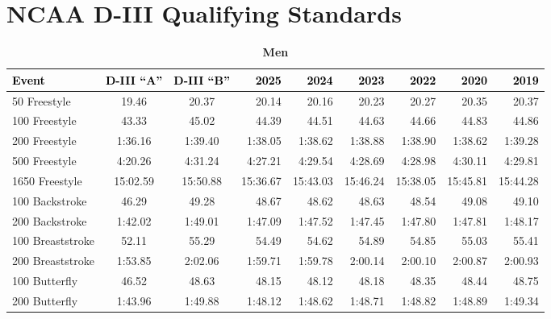 \clearpage
\section{NCAA D-III Qualifying Standards}

\begin{table}[htbp]
\centering
\caption*{\textbf{\textcolor{teamprimary}{Men}}}
\renewcommand{\arraystretch}{1.2}
\scriptsize
\begin{tabularx}{\textwidth}{lccrrrrrr}
\toprule
\rowcolor{teamprimary!25}
\textbf{\textcolor{black}{Event}} & \textbf{\textcolor{black}{D-III ``A''}} & \textbf{\textcolor{black}{D-III ``B''}} & \textbf{\textcolor{black}{2025}} & \textbf{\textcolor{black}{2024}} & \textbf{\textcolor{black}{2023}} & \textbf{\textcolor{black}{2022}} & \textbf{\textcolor{black}{2020}} & \textbf{\textcolor{black}{2019}} \\
\midrule
\rowcolor{teamsecondary!12}
50 Freestyle & 19.46 & 20.37 & 20.14 & 20.16 & 20.23 & 20.27 & 20.35 & 20.37 \\
\rowcolor{teamprimary!8}
100 Freestyle & 43.33 & 45.02 & 44.39 & 44.51 & 44.63 & 44.66 & 44.83 & 44.86 \\
\rowcolor{teamsecondary!12}
200 Freestyle & 1:36.16 & 1:39.40 & 1:38.05 & 1:38.62 & 1:38.88 & 1:38.90 & 1:38.62 & 1:39.28 \\
\rowcolor{teamprimary!8}
500 Freestyle & 4:20.26 & 4:31.24 & 4:27.21 & 4:29.54 & 4:28.69 & 4:28.98 & 4:30.11 & 4:29.81 \\
\rowcolor{teamsecondary!12}
1650 Freestyle & 15:02.59 & 15:50.88 & 15:36.67 & 15:43.03 & 15:46.24 & 15:38.05 & 15:45.81 & 15:44.28 \\
\rowcolor{teamprimary!8}
100 Backstroke & 46.29 & 49.28 & 48.67 & 48.62 & 48.63 & 48.54 & 49.08 & 49.10 \\
\rowcolor{teamsecondary!12}
200 Backstroke & 1:42.02 & 1:49.01 & 1:47.09 & 1:47.52 & 1:47.45 & 1:47.80 & 1:47.81 & 1:48.17 \\
\rowcolor{teamprimary!8}
100 Breaststroke & 52.11 & 55.29 & 54.49 & 54.62 & 54.89 & 54.85 & 55.03 & 55.41 \\
\rowcolor{teamsecondary!12}
200 Breaststroke & 1:53.85 & 2:02.06 & 1:59.71 & 1:59.78 & 2:00.14 & 2:00.10 & 2:00.87 & 2:00.93 \\
\rowcolor{teamprimary!8}
100 Butterfly & 46.52 & 48.63 & 48.15 & 48.12 & 48.18 & 48.35 & 48.44 & 48.75 \\
\rowcolor{teamsecondary!12}
200 Butterfly & 1:43.96 & 1:49.88 & 1:48.12 & 1:48.62 & 1:48.71 & 1:48.82 & 1:48.89 & 1:49.34 \\

\end{tabularx}
\end{table}
